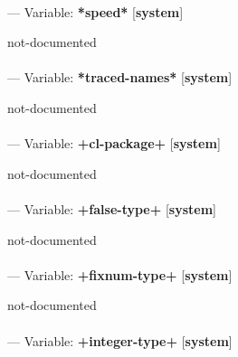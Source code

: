 \paragraph{}
\label{SYSTEM:*SPEED*}
--- Variable: \textbf{*speed*} [\textbf{system}] \textit{}

\begin{adjustwidth}{5em}{5em}
not-documented
\end{adjustwidth}

\paragraph{}
\label{SYSTEM:*TRACED-NAMES*}
--- Variable: \textbf{*traced-names*} [\textbf{system}] \textit{}

\begin{adjustwidth}{5em}{5em}
not-documented
\end{adjustwidth}

\paragraph{}
\label{SYSTEM:+CL-PACKAGE+}
--- Variable: \textbf{+cl-package+} [\textbf{system}] \textit{}

\begin{adjustwidth}{5em}{5em}
not-documented
\end{adjustwidth}

\paragraph{}
\label{SYSTEM:+FALSE-TYPE+}
--- Variable: \textbf{+false-type+} [\textbf{system}] \textit{}

\begin{adjustwidth}{5em}{5em}
not-documented
\end{adjustwidth}

\paragraph{}
\label{SYSTEM:+FIXNUM-TYPE+}
--- Variable: \textbf{+fixnum-type+} [\textbf{system}] \textit{}

\begin{adjustwidth}{5em}{5em}
not-documented
\end{adjustwidth}

\paragraph{}
\label{SYSTEM:+INTEGER-TYPE+}
--- Variable: \textbf{+integer-type+} [\textbf{system}] \textit{}


